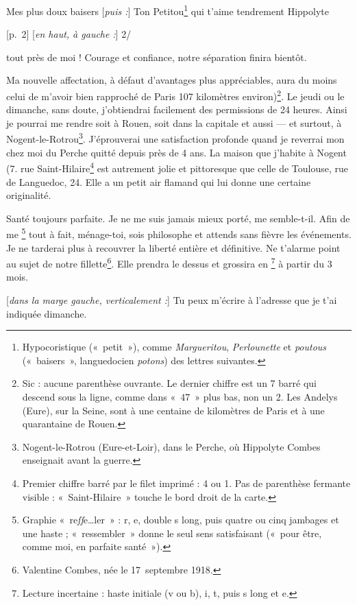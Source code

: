 \begin{LJlettre}
 Mes plus doux baisers [\textit{puis :}] Ton Petitou\label{annexe:doc5-petitou}\footnote{Hypocoristique («~petit~»), comme \textit{Margueritou}, \textit{Perlounette} et \textit{poutous} («~baisers~», languedocien \textit{potons}) des lettres suivantes.} qui t'aime  tendrement Hippolyte

[p.~2] [\textit{en haut, à gauche :}] 2/\par\nopagebreak[4]

tout près de moi ! Courage et confiance, notre séparation finira bientôt.

Ma nouvelle affectation, à défaut d'avantages plus appréciables, aura du moins celui de m'avoir bien rapproché de Paris 107 kilomètres environ)\footnote{Sic : aucune parenthèse ouvrante. Le dernier chiffre est un 7 barré qui descend sous la ligne, comme dans «~47~» plus bas, non un 2. Les Andelys (Eure), sur la Seine, sont à une centaine de kilomètres de Paris et à une quarantaine de Rouen.}. Le jeudi ou le dimanche, sans doute, j'obtiendrai facilement des permissions de 24 heures. Ainsi je pourrai me rendre soit à Rouen, soit dans la capitale et aussi --- et surtout, à Nogent-le-Rotrou\footnote{Nogent-le-Rotrou (Eure-et-Loir), dans le Perche, où Hippolyte Combes enseignait avant la guerre.}. J'éprouverai une satisfaction profonde quand je reverrai mon chez moi du Perche quitté depuis près de 4 ans. La maison que j'habite à Nogent (7. rue Saint-Hilaire\footnote{Premier chiffre barré par le filet imprimé : 4 ou 1. Pas de parenthèse fermante visible : «~Saint-Hilaire~» touche le bord droit de la carte.} est autrement jolie et pittoresque que celle de Toulouse, rue de Languedoc, 24\label{annexe:doc5-languedoc}. Elle a un petit air flamand qui lui donne une certaine originalité.

Santé toujours parfaite. Je ne me suis jamais mieux porté, me semble-t-il. Afin de me \footnote{Graphie «~re\textit{ſſ}e\ldots{}ler~» : r, e, double s long, puis quatre ou cinq jambages et une haste ; «~ressembler~» donne le seul sens satisfaisant («~pour être, comme moi, en parfaite santé~»).} tout à fait, ménage-toi, sois philosophe et attends sans fièvre les événements. Je ne tarderai plus à recouvrer la liberté entière et définitive. Ne t'alarme point au sujet de notre fillette\footnote{Valentine Combes, née le 17~septembre 1918.}. Elle prendra le dessus et grossira en \footnote{Lecture incertaine : haste initiale (v ou b), i, t, puis s long et e.} à partir du 3 mois.

[\textit{dans la marge gauche, verticalement :}] Tu peux m'écrire à l'adresse que je t'ai indiquée dimanche.
\end{LJlettre}


